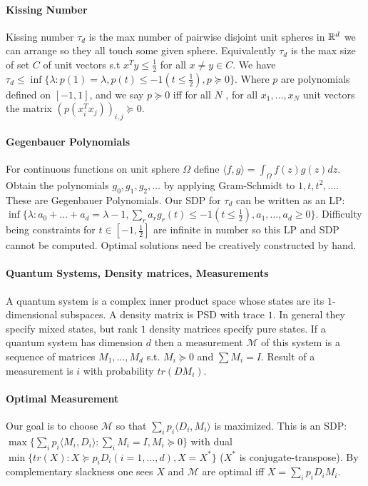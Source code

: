 \documentclass[letterpaper,11pt,oneside,onecolumn]{article}
\newcommand{\cM}{\mathcal{M}} \newcommand{\cN}{\mathcal{N}}
\begin{document}
\paragraph{Kissing Number} Kissing number $\tau_d$ is the max number of pairwise disjoint unit spheres in $\mathbb{R}^d$ we can arrange so they all touch some given sphere. Equivalently $\tau_d$ is the max size of set $C$ of unit vectors s.t $x^Ty\leq \frac{1}{2}$ for all $x\neq y \in C$. We have $\tau_d \leq \inf \{\lambda: p(1) = \lambda, p(t) \leq -1 (t \leq \frac{1}{2}), p \succcurlyeq 0\}$. Where $p$ are polynomials defined on $[-1,1]$, and we say $p\succcurlyeq 0$ iff for all $N$ , for all $x_1,\dots, x_N$ unit vectors the matrix $(p(x_i^Tx_j))_{i,j} \succcurlyeq 0$.
\paragraph{Gegenbauer Polynomials} For continuous functions on unit sphere $\Omega$ define $\langle f, g\rangle = \int_\Omega f(z)g(z) dz$. Obtain the polynomials $g_0, g_1, g_2,\dots$ by applying Gram-Schmidt to $1,t,t^2,\dots$. These are Gegenbauer Polynomials. Our SDP for $\tau_d$ can be written as an LP: $\inf\{\lambda: a_0 + \dots + a_d = \lambda - 1, \sum_r a_r g_r(t) \leq -1 (t\leq \frac{1}{2}), a_1, \dots, a_d \geq 0\}$. Difficulty being constraints for $t\in [-1,\frac{1}{2}]$ are infinite in number so this LP and SDP cannot be computed. Optimal solutions need be creatively constructed by hand.
\paragraph{Quantum Systems, Density matrices, Measurements}A quantum system is a complex inner product space whose states are its $1$-dimensional subspaces. A density matrix is PSD with trace $1$. In general they specify mixed states, but rank $1$ density matrices specify pure states. If a quantum system has dimension $d$ then a measurement $\cM$ of this system is a sequence of matrices $M_1, \dots, M_d$ s.t. $M_i \succcurlyeq 0$ and $\sum M_i = I$. Result of a measurement is $i$ with probability $tr(DM_i)$.
\paragraph{Optimal Measurement}
Our goal is to choose $\cM$ so that $\sum_i p_i \langle D_i, M_i \rangle$ is maximized. This is an SDP: $\max \{\sum_i p_i\langle M_i, D_i \rangle : \sum_i M_i = I, M_i \succcurlyeq 0\}$ with dual $\min\{tr(X) : X \succcurlyeq p_iD_i (i =1, \dots, d), X = X^*\}$ ($X^*$ is conjugate-transpose). By complementary slackness one sees $X$ and $\cM$ are optimal iff $X=\sum_i p_iD_iM_i$.
\end{document}
